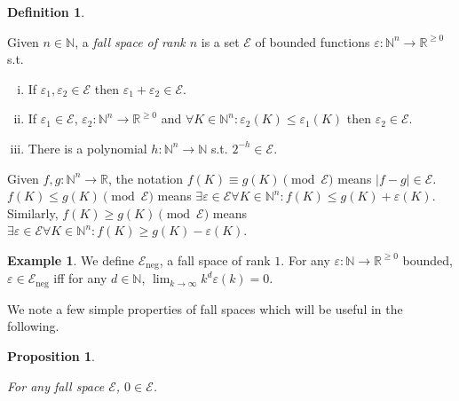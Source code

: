 \documentclass{article}
\numberwithin{equation}{section}
\theoremstyle{definition}
\newtheorem{definition}{Definition}[section]
\newtheorem{example}{Example}[section]
\theoremstyle{plain}
\newtheorem{proposition}{Proposition}[section]
\newcommand{\Nats}{\mathbb{N}}
\newcommand{\Reals}{\mathbb{R}}
\newcommand{\Lim}[1]{\lim_{#1 \rightarrow \infty}}
\newcommand{\Abs}[1]{\lvert #1 \rvert}
\newcommand{\Fall}{\mathcal{E}}
\begin{document}
\begin{definition}
\label{def:fall}

Given $n \in \Nats$, a \emph{fall space of rank $n$} is a set $\Fall$ of bounded functions $\varepsilon: \Nats^n \rightarrow \Reals^{\geq 0}$ s.t.

\begin{enumerate}[(i)]

\item\label{con:def__fall__add} If $\varepsilon_1, \varepsilon_2 \in \Fall$ then $\varepsilon_1 + \varepsilon_2 \in \Fall$.

\item\label{con:def__fall__ineq} If $\varepsilon_1 \in \Fall$, $\varepsilon_2: \Nats^n \rightarrow \Reals^{\geq 0}$ and $\forall K \in \Nats^n: \varepsilon_2(K) \leq \varepsilon_1(K)$ then $\varepsilon_2 \in \Fall$.

\item\label{con:def__fall__pol} There is a polynomial $h: \Nats^n \rightarrow \Nats$ s.t. $2^{-h} \in \Fall$.

\end{enumerate}

Given $f,g: \Nats^n \rightarrow \Reals$, the notation $f(K) \equiv g(K) \pmod \Fall$ means $\Abs{f-g} \in \Fall$. $f(K) \leq g(K) \pmod \Fall$ means $\exists \varepsilon \in \Fall \forall K \in \Nats^n: f(K) \leq g(K) + \varepsilon(K)$. Similarly, $f(K) \geq g(K) \pmod \Fall$ means $\exists \varepsilon \in \Fall \forall K \in \Nats^n: f(K) \geq g(K) - \varepsilon(K)$.

\end{definition}

\begin{example}

We define $\Fall_{\text{neg}}$, a fall space of rank $1$. For any $\varepsilon: \Nats \rightarrow \Reals^{\geq 0}$ bounded, $\varepsilon \in \Fall_{\text{neg}}$ iff for any $d \in \Nats$, $\Lim{k} k^d \varepsilon(k) = 0$.

\end{example}

We note a few simple properties of fall spaces which will be useful in the following.

\begin{proposition}
\label{prp:err_spc_zero}

For any fall space $\Fall$, $0 \in \Fall$.

\end{proposition}
\end{document}
